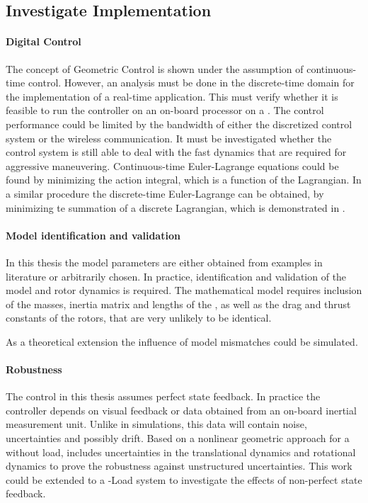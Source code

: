 \subsection{Investigate Implementation}

\paragraph{Digital Control} The concept of Geometric Control is shown under the assumption of continuous-time control. 
However, an analysis must be done in the discrete-time domain for the implementation of a real-time application. This must verify whether it is feasible to run the controller on an on-board processor on a . The control performance could be limited by the bandwidth of either the discretized control system or the wireless communication.
It must be investigated whether the control system is still able to deal with the fast dynamics that are required for aggressive maneuvering. 
Continuous-time Euler-Lagrange equations could be found by minimizing the action integral, which is a function of the Lagrangian. In a similar procedure the discrete-time Euler-Lagrange can be obtained, by minimizing te summation of a discrete Lagrangian, which is demonstrated in \cite{Lee2008}. 

\paragraph{Model identification and validation}
In this thesis the model parameters are either obtained from examples in literature or arbitrarily chosen. In practice, identification and validation of the  model and rotor dynamics is required.
The mathematical model requires inclusion of the masses, inertia matrix and lengths of the , as well as the drag and thrust constants of the rotors, that are very unlikely to be identical.

As a theoretical extension the influence of model mismatches could be simulated.

\paragraph{Robustness}
The control in this thesis assumes perfect state feedback. In practice the controller depends on visual feedback or data obtained from an on-board inertial measurement unit. Unlike in simulations, this data will contain noise, uncertainties and possibly drift. 
Based on a nonlinear geometric approach for a  without load, \cite{Goodarzi2013a} includes uncertainties in the translational dynamics and rotational dynamics to prove the robustness against unstructured uncertainties. This work could be extended to a -Load system to investigate the effects of non-perfect state feedback. 

